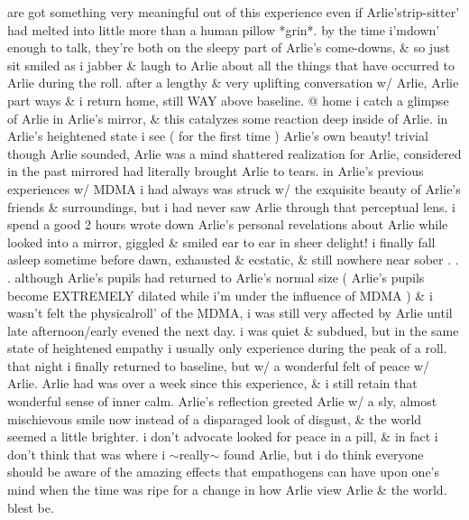 \documentclass[12pt]{book}
\begin{document}
are got something very meaningful out of this experience even if Arlie'strip-sitter' had melted into little more than a human pillow *grin*. by the time i'mdown' enough to talk, they're both on the sleepy part of Arlie's come-downs, \& so just sit smiled as i jabber \& laugh to Arlie about all the things that have occurred to Arlie during the roll. after a lengthy \& very uplifting conversation w/ Arlie, Arlie part ways \& i return home, still WAY above baseline. @ home i catch a glimpse of Arlie in Arlie's mirror, \& this catalyzes some reaction deep inside of Arlie. in Arlie's heightened state i see ( for the first time ) Arlie's own beauty! trivial though Arlie sounded, Arlie was a mind shattered realization for Arlie, considered in the past mirrored had literally brought Arlie to tears. in Arlie's previous experiences w/ MDMA i had always was struck w/ the exquisite beauty of Arlie's friends \& surroundings, but i had never saw Arlie through that perceptual lens. i spend a good 2 hours wrote down Arlie's personal revelations about Arlie while looked into a mirror, giggled \& smiled ear to ear in sheer delight! i finally fall asleep sometime before dawn, exhausted \& ecstatic, \& still nowhere near sober . . .  although Arlie's pupils had returned to Arlie's normal size ( Arlie's pupils become EXTREMELY dilated while i'm under the influence of MDMA ) \& i wasn't felt the physicalroll' of the MDMA, i was still very affected by Arlie until late afternoon/early evened the next day. i was quiet \& subdued, but in the same state of heightened empathy i usually only experience during the peak of a roll. that night i finally returned to baseline, but w/ a wonderful felt of peace w/ Arlie. Arlie had was over a week since this experience, \& i still retain that wonderful sense of inner calm. Arlie's reflection greeted Arlie w/ a sly, almost mischievous smile now instead of a disparaged look of disgust, \& the world seemed a little brighter. i don't advocate looked for peace in a pill, \& in fact i don't think that was where i $\sim$really$\sim$ found Arlie, but i do think everyone should be aware of the amazing effects that empathogens can have upon one's mind when the time was ripe for a change in how Arlie view Arlie \& the world. blest be.
\end{document}
